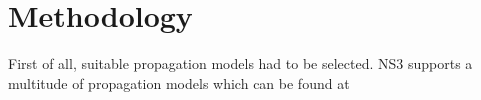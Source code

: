 \section[short]{Methodology}

First of all, suitable propagation models had to be selected.
NS3 supports a multitude of propagation models which can be found at 



